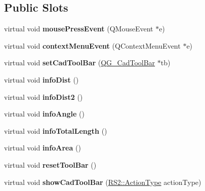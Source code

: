 \subsection*{Public Slots}
\begin{DoxyCompactItemize}
\item 
\hypertarget{classQG__CadToolBarInfo_aa607f6132342d5e5efb289a5ad580aef}{virtual void {\bfseries mouse\-Press\-Event} (Q\-Mouse\-Event $\ast$e)}\label{classQG__CadToolBarInfo_aa607f6132342d5e5efb289a5ad580aef}

\item 
\hypertarget{classQG__CadToolBarInfo_a21e327fe1bc403ec4efb5e18f82a61eb}{virtual void {\bfseries context\-Menu\-Event} (Q\-Context\-Menu\-Event $\ast$e)}\label{classQG__CadToolBarInfo_a21e327fe1bc403ec4efb5e18f82a61eb}

\item 
\hypertarget{classQG__CadToolBarInfo_ac4b40a75e3d342657655ea84514eb456}{virtual void {\bfseries set\-Cad\-Tool\-Bar} (\hyperlink{classQG__CadToolBar}{Q\-G\-\_\-\-Cad\-Tool\-Bar} $\ast$tb)}\label{classQG__CadToolBarInfo_ac4b40a75e3d342657655ea84514eb456}

\item 
\hypertarget{classQG__CadToolBarInfo_ac58fa5f812f1106472b0b6104afc9dbb}{virtual void {\bfseries info\-Dist} ()}\label{classQG__CadToolBarInfo_ac58fa5f812f1106472b0b6104afc9dbb}

\item 
\hypertarget{classQG__CadToolBarInfo_a9db83a07addc69ffd0d2d39c27917276}{virtual void {\bfseries info\-Dist2} ()}\label{classQG__CadToolBarInfo_a9db83a07addc69ffd0d2d39c27917276}

\item 
\hypertarget{classQG__CadToolBarInfo_a4322e26f7b365f4f403e616d4bf9b8f9}{virtual void {\bfseries info\-Angle} ()}\label{classQG__CadToolBarInfo_a4322e26f7b365f4f403e616d4bf9b8f9}

\item 
\hypertarget{classQG__CadToolBarInfo_a5a2b242db81626cdab1f7eaf59029627}{virtual void {\bfseries info\-Total\-Length} ()}\label{classQG__CadToolBarInfo_a5a2b242db81626cdab1f7eaf59029627}

\item 
\hypertarget{classQG__CadToolBarInfo_accd46f29357dd7bd7cfaa7ec02b2ce47}{virtual void {\bfseries info\-Area} ()}\label{classQG__CadToolBarInfo_accd46f29357dd7bd7cfaa7ec02b2ce47}

\item 
\hypertarget{classQG__CadToolBarInfo_af232d501a8399c205b1d9e96eb1e70ea}{virtual void {\bfseries reset\-Tool\-Bar} ()}\label{classQG__CadToolBarInfo_af232d501a8399c205b1d9e96eb1e70ea}

\item 
\hypertarget{classQG__CadToolBarInfo_a166563daa477adbbde3a70ed3f9a9f48}{virtual void {\bfseries show\-Cad\-Tool\-Bar} (\hyperlink{classRS2_afe3523e0bc41fd637b892321cfc4b9d7}{R\-S2\-::\-Action\-Type} action\-Type)}\label{classQG__CadToolBarInfo_a166563daa477adbbde3a70ed3f9a9f48}

\end{DoxyCompactItemize}
